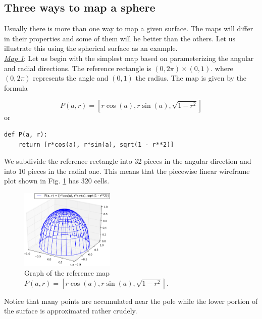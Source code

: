 \subsection{Three ways to map a sphere}

Usually there is more than one way to 
map a given surface. The maps will differ in their properties 
and some of them will be better than the others. Let us
illustrate this using the spherical surface as an example. \\

\noindent
\underline{\em Map 1}: Let us begin with the simplest map based on parameterizing 
the angular and radial directions. The reference rectangle is $(0, 2\pi)\times(0, 1)$. 
where $(0, 2\pi)$ represents the angle and $(0, 1)$ the radius. The map is given by the formula

$$
P(a, r) = \left[r\cos(a), r\sin(a), \sqrt{1 - r^2}\right]
$$
or\\

\begin{bbox}
\begin{verbatim}
def P(a, r):
    return [r*cos(a), r*sin(a), sqrt(1 - r**2)]
\end{verbatim}
\end{bbox}
\vspace{6mm}

\noindent
We subdivide the reference rectangle into 32 pieces in the angular direction
and into 10 pieces in the radial one. This means that the piecewise linear 
wireframe plot shown in Fig. \ref{fig:paramsu5} has 320 cells. 
\newpage

\begin{figure}[!ht]
\begin{center}
\includegraphics[width=0.4\textwidth]{img/paramsu5.png}
\end{center}
\vspace{-6mm}
\caption{Graph of the reference map $P(a, r) = \left[r\cos(a), r\sin(a), \sqrt{1 - r^2}\right]$.}
\label{fig:paramsu5}
\end{figure}
\noindent
Notice that many points are accumulated near the pole while the lower portion
of the surface is approximated rather crudely. \\

